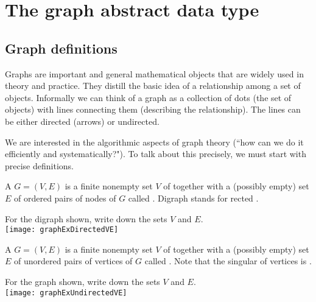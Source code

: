 \part{The graph abstract data type}
\label{ch:graphadt} 

\chapter{Graph definitions} %
\label{sec:graphdefs}
Graphs are important and general mathematical objects that are widely used in theory and practice. 
They distill the basic idea of a relationship among a set of objects. 
Informally we can think of a graph as a collection of dots (the set of objects) with lines connecting them (describing the relationship). 
The lines can be either directed (arrows) or undirected.

We are interested in the algorithmic aspects of graph theory (``how can we do it efficiently and systematically?").  
To talk about this precisely, we must start with precise definitions.

\begin{Definition}\label{def:digraph} 
A  $G=(V,E)$ is a  finite nonempty set $V$ of  
together with a (possibly empty) set $E$ of ordered pairs of nodes of $G$ called . 
Digraph stands for rected .
\end{Definition}

\begin{Boxample}[0.5] \label{ex:digraph}
For the digraph shown, write down the sets $V$ and $E$.\\
\newline 
\texttt{[image: graphExDirectedVE]}
\end{Boxample}

\begin{Definition}\label{def:graph}
A  $G = (V, E)$ is a finite nonempty  set $V$ of 
 together with a (possibly empty) set $E$ of unordered
pairs of vertices of $G$ called . 
Note that the singular of vertices is .
\end{Definition}

\begin{Boxample}[0.5] \label{ex:graph}
For the graph shown, write down the sets $V$ and $E$.\\
\newline 
\texttt{[image: graphExUndirectedVE]}
\end{Boxample}


